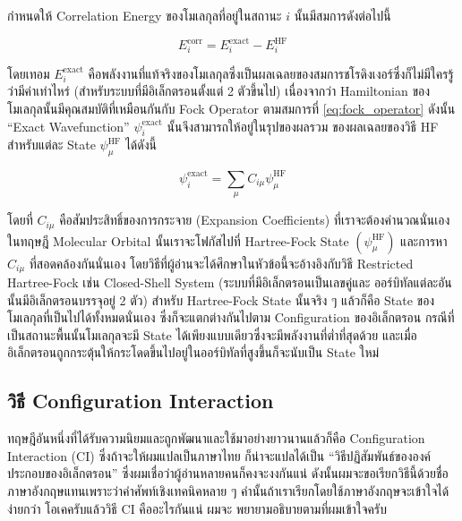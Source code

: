 กำหนดให้ Correlation Energy ของโมเลกุลที่อยู่ในสถานะ $i$ นั้นมีสมการดังต่อไปนี้

\begin{equation}
    \label{eq:Correlation_Energy}
    E^{\text{corr}}_{i}
    =
    E^{\text{exact}}_{i} - E^{\text{HF}}_{i}
\end{equation}

\noindent โดยเทอม $E^{\text{exact}}_{i}$ คือพลังงานที่แท้จริงของโมเลกุลซึ่งเป็นผลเฉลยของสมการชโรดิงเงอร์ซึ่งก็ไม่มีใครรู้ว่ามีค่าเท่าไหร่
(สำหรับระบบที่มีอิเล็กตรอนตั้งแต่ 2 ตัวขึ้นไป) เนื่องจากว่า Hamiltonian ของโมเลกุลนั้นมีคุณสมบัติที่เหมือนกันกับ Fock Operator ตามสมการที่
\ref{eq:fock_operator} ดังนั้น \enquote{Exact Wavefunction} $\psi^{\text{exact}}_{i}$ นั้นจึงสามารถให้อยู่ในรุปของผลรวม%
ของผลเฉลยของวิธี HF สำหรับแต่ละ State $\psi^{\text{HF}}_{\mu}$ ได้ดังนี้

\begin{equation}
    \label{eq:Exact_Wavefunction}
    \psi^{\text{exact}}_{i}
    =
    \sum_{\mu} C_{i \mu} \psi^{\text{HF}}_{\mu}
\end{equation}

\noindent โดยที่ $C_{i \mu}$ คือสัมประสิทธิ์ของการกระจาย (Expansion Coefficients) ที่เราจะต้องคำนวณนั่นเอง ในทฤษฎี Molecular
Orbital นั้นเราจะโฟกัสไปที่ Hartree-Fock State $(\psi^{\text{HF}}_{\mu})$ และการหา $C_{i \mu}$ ที่สอดคล้องกันนั่นเอง
โดยวิธีที่ผู้อ่านจะได้ศึกษาในหัวข้อนี้จะอ้างอิงกับวิธี Restricted Hartree-Fock เช่น Closed-Shell System (ระบบที่มีอิเล็กตรอนเป็นเลขคู่และ%
ออร์บิทัลแต่ละอันนั้นมีอิเล็กตรอนบรรจุอยู่ 2 ตัว) สำหรับ Hartree-Fock State นั้นจริง ๆ แล้วก็คือ State ของโมเลกุลที่เป็นไปได้ทั้งหมดนั่นเอง%
ซึ่งก็จะแตกต่างกันไปตาม Configuration ของอิเล็กตรอน กรณีที่เป็นสถานะพื้นนั้นโมเลกุลจะมี State ได้เพียงแบบเดียวซึ่งจะมีพลังงานที่ต่ำที่สุดด้วย%
และเมื่ออิเล็กตรอนถูกกระตุ้นให้กระโดดขึ้นไปอยู่ในออร์บิทัลที่สูงขึ้นก็จะนับเป็น State ใหม่

\subsection{วิธี Configuration Interaction}

ทฤษฎีอันหนึ่งที่ได้รับความนิยมและถูกพัฒนาและใช้มาอย่างยาวนานแล้วก็คือ Configuration Interaction (CI) ซึ่งถ้าจะให้ผมแปลเป็นภาษาไทย%
ก็น่าจะแปลได้เป็น \enquote{วิธีปฏิสัมพันธ์ขององค์ประกอบของอิเล็กตรอน} ซึ่งผมเชื่อว่าผู้อ่านหลายคนก็คงจะงงกันแน่ ดังนั้นผมจะขอเรียกวิธีนี้ด้วยชื่อ%
ภาษาอังกฤษแทนเพราะว่าคำศัพท์เชิงเทคนิคหลาย ๆ คำนั้นถ้าเราเรียกโดยใช้ภาษาอังกฤษจะเข้าใจได้ง่ายกว่า โอเคครับแล้ววิธี CI คืออะไรกันแน่ ผมจะ%
พยายามอธิบายตามที่ผมเข้าใจครับ

